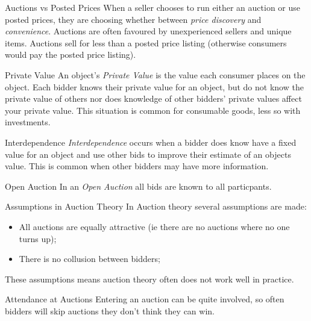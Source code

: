 \documentclass[11pt,a4paper]{article}
\begin{document}
  \begin{proposition}{Auctions vs Posted Prices}
    When a seller chooses to run either an auction or use posted prices, they are choosing whether between \textit{price discovery} and \textit{convenience}. Auctions are often favoured by unexperienced sellers and unique items. Auctions sell for less than a posted price listing (otherwise consumers would pay the posted price listing).
  \end{proposition}

  \begin{definition}{Private Value}
    An object's \textit{Private Value} is the value each consumer places on the object. Each bidder knows their private value for an object, but do not know the private value of others nor does knowledge of other bidders' private values affect your private value. This situation is common for consumable goods, less so with investments.
  \end{definition}

  \begin{definition}{Interdependence}
    \textit{Interdependence} occurs when a bidder does know have a fixed value for an object and use other bids to improve their estimate of an objects value. This is common when other bidders may have more information.
  \end{definition}

  \begin{definition}{Open Auction}
    In an \textit{Open Auction} all bids are known to all particpants.
  \end{definition}

  \begin{remark}{Assumptions in Auction Theory}
    In Auction theory several assumptions are made:
    \begin{itemize}
      \item All auctions are equally attractive (ie there are no auctions where no one turns up);
      \item There is no collusion between bidders;
    \end{itemize}
    These assumptions means auction theory often does not work well in practice.
  \end{remark}

  \begin{remark}{Attendance at Auctions}
    Entering an auction can be quite involved, so often bidders will skip auctions they don't think they can win.
  \end{remark}
\end{document}

